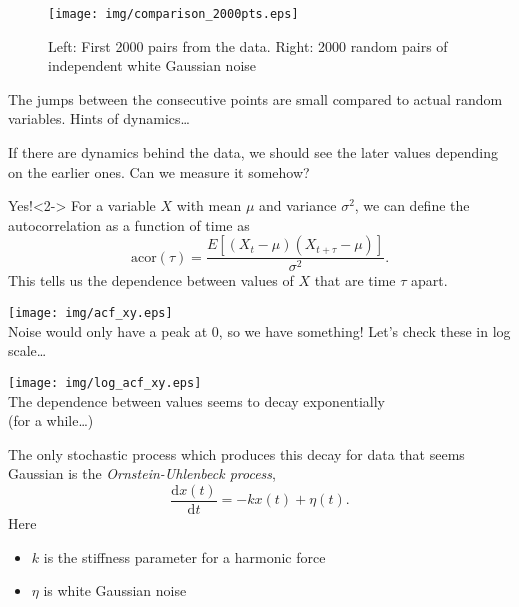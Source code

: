 \documentclass{beamer}
\begin{document}
\begin{frame}
\begin{figure}
\centering
\texttt{[image: img/comparison\_2000pts.eps]}
\caption{Left: First 2000 pairs from the data. Right: 2000 random pairs of independent white Gaussian noise}
\end{figure}
The jumps between the consecutive points are small compared to actual random variables. Hints of dynamics\dots

\end{frame}

\begin{frame}
If there are dynamics behind the data, we should see the later values depending on the earlier ones. Can we measure it somehow?

\begin{block}{Yes!}<2->
For a variable $X$ with mean $\mu$ and variance $\sigma^2$, we can define the autocorrelation as a function of time as
\[
 \mathrm{acor}(\tau) = \frac{E[(X_t - \mu)(X_{t+\tau} - \mu)]}{\sigma^2}.
\]
This tells us the dependence between values of $X$ that are time $\tau$ apart. 
\end{block}

\end{frame}

\begin{frame}
\centering
\texttt{[image: img/acf\_xy.eps]}\\

Noise would only have a peak at 0, so we have something! Let's check these in log scale\dots
\end{frame}

\begin{frame}
\centering
\texttt{[image: img/log\_acf\_xy.eps]}\\

The dependence between values seems to decay exponentially\\ (for a while\dots)
\end{frame}

\begin{frame}
The only stochastic process which produces this decay for data that seems Gaussian is the \emph{Ornstein-Uhlenbeck process},
\[
 \frac{\mathrm dx(t)}{\mathrm dt} = - k x(t) + \eta(t).
\]
Here
\begin{itemize}
 \item $k$ is the stiffness parameter for a harmonic force
 \item $\eta$ is white Gaussian noise
\end{itemize}
\end{frame}
\end{document}
